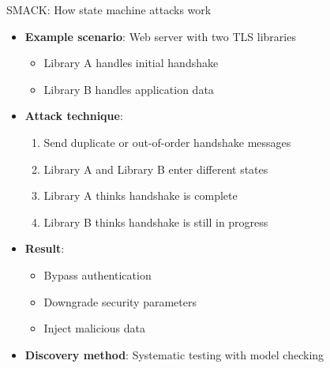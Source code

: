 \documentclass[aspectratio=169, lualatex, handout]{beamer}
\begin{document}
\begin{frame}{SMACK: How state machine attacks work}
	\begin{itemize}
		\item \textbf{Example scenario}: Web server with two TLS libraries
		      \begin{itemize}
			      \item Library A handles initial handshake
			      \item Library B handles application data
		      \end{itemize}
		\item \textbf{Attack technique}:
		      \begin{enumerate}
			      \item Send duplicate or out-of-order handshake messages
			      \item Library A and Library B enter different states
			      \item Library A thinks handshake is complete
			      \item Library B thinks handshake is still in progress
		      \end{enumerate}
		\item \textbf{Result}:
		      \begin{itemize}
			      \item Bypass authentication
			      \item Downgrade security parameters
			      \item Inject malicious data
		      \end{itemize}
		\item \textbf{Discovery method}: Systematic testing with model checking
	\end{itemize}
\end{frame}
\end{document}
